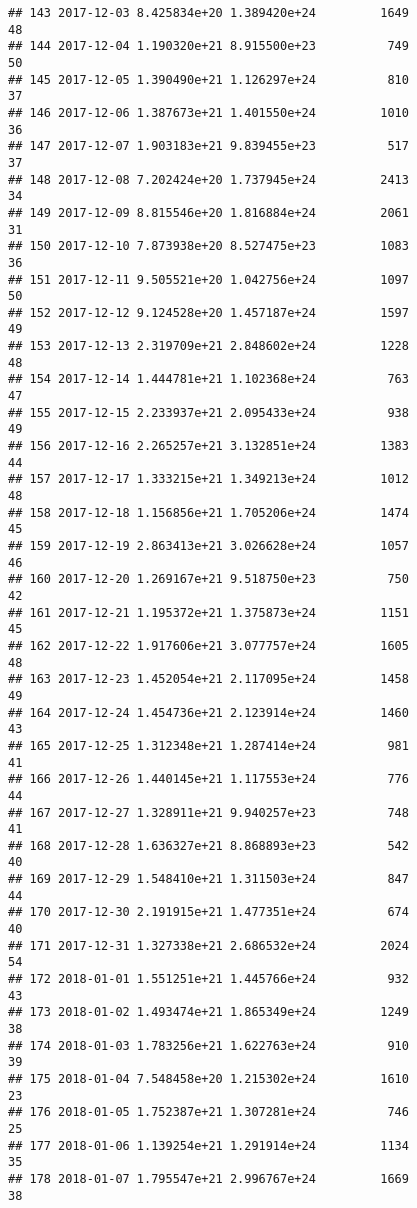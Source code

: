 \documentclass[]{article}
\begin{document}
\begin{verbatim}
## 143 2017-12-03 8.425834e+20 1.389420e+24         1649              48
## 144 2017-12-04 1.190320e+21 8.915500e+23          749              50
## 145 2017-12-05 1.390490e+21 1.126297e+24          810              37
## 146 2017-12-06 1.387673e+21 1.401550e+24         1010              36
## 147 2017-12-07 1.903183e+21 9.839455e+23          517              37
## 148 2017-12-08 7.202424e+20 1.737945e+24         2413              34
## 149 2017-12-09 8.815546e+20 1.816884e+24         2061              31
## 150 2017-12-10 7.873938e+20 8.527475e+23         1083              36
## 151 2017-12-11 9.505521e+20 1.042756e+24         1097              50
## 152 2017-12-12 9.124528e+20 1.457187e+24         1597              49
## 153 2017-12-13 2.319709e+21 2.848602e+24         1228              48
## 154 2017-12-14 1.444781e+21 1.102368e+24          763              47
## 155 2017-12-15 2.233937e+21 2.095433e+24          938              49
## 156 2017-12-16 2.265257e+21 3.132851e+24         1383              44
## 157 2017-12-17 1.333215e+21 1.349213e+24         1012              48
## 158 2017-12-18 1.156856e+21 1.705206e+24         1474              45
## 159 2017-12-19 2.863413e+21 3.026628e+24         1057              46
## 160 2017-12-20 1.269167e+21 9.518750e+23          750              42
## 161 2017-12-21 1.195372e+21 1.375873e+24         1151              45
## 162 2017-12-22 1.917606e+21 3.077757e+24         1605              48
## 163 2017-12-23 1.452054e+21 2.117095e+24         1458              49
## 164 2017-12-24 1.454736e+21 2.123914e+24         1460              43
## 165 2017-12-25 1.312348e+21 1.287414e+24          981              41
## 166 2017-12-26 1.440145e+21 1.117553e+24          776              44
## 167 2017-12-27 1.328911e+21 9.940257e+23          748              41
## 168 2017-12-28 1.636327e+21 8.868893e+23          542              40
## 169 2017-12-29 1.548410e+21 1.311503e+24          847              44
## 170 2017-12-30 2.191915e+21 1.477351e+24          674              40
## 171 2017-12-31 1.327338e+21 2.686532e+24         2024              54
## 172 2018-01-01 1.551251e+21 1.445766e+24          932              43
## 173 2018-01-02 1.493474e+21 1.865349e+24         1249              38
## 174 2018-01-03 1.783256e+21 1.622763e+24          910              39
## 175 2018-01-04 7.548458e+20 1.215302e+24         1610              23
## 176 2018-01-05 1.752387e+21 1.307281e+24          746              25
## 177 2018-01-06 1.139254e+21 1.291914e+24         1134              35
## 178 2018-01-07 1.795547e+21 2.996767e+24         1669              38

\end{verbatim}
\end{document}
